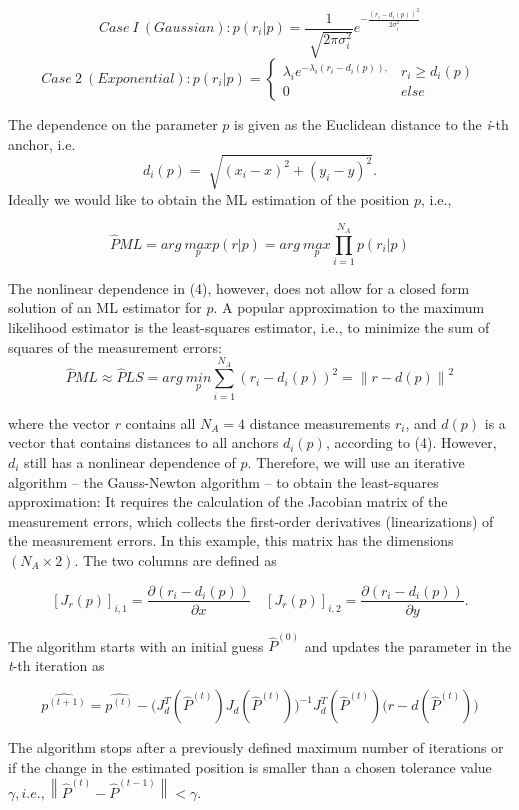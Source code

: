 \documentclass[a4paper]{article}
\newcommand\norm[1]{\left\lVert#1\right\rVert}
\begin{document}
\[
Case ~I ~(Gaussian): p(r_i|p) = \frac{1}{\sqrt[]{2\pi\sigma^2_i}}e^{-\frac{(r_i-d_i(p))^2}{2\sigma^2_i}}
\]
\[
Case ~2 ~(Exponential): p(r_i|p) = \begin{cases} \lambda_i e^{-\lambda_i(r_i-d_i(p)),} & r_i\geq d_i(p)\\ 0 & else  \end{cases}
\]

\noindent
The dependence on the parameter $p$ is given as the Euclidean distance to the \textit{i}-th anchor, i.e.
\[
d_i(p) = \sqrt[]{(x_i-x)^2 + (y_i-y)^2}.
\]
Ideally we would like to obtain the ML estimation of the position $p$, i.e.,

\[
\hat{P}ML = arg ~\underset{p}{max} p(r|p) = arg ~\underset{p}{max} \prod_{i=1}^{N_A} p(r_i|p)
\]

\noindent
The nonlinear dependence in (4), however, does not allow for a closed form solution of an ML estimator for $p$. A popular approximation to the maximum likelihood estimator is the least-squares estimator, i.e., to minimize the sum of squares of the measurement errors:
\[
\hat{P}ML \approx \hat{P}LS = arg ~\underset{p}{min} \sum_{i=1}^{N_A} (r_i-d_i(p))^2 = \norm{r-d(p)}^2 
\]

\noindent
where the vector $r$ contains all $N_A = 4$ distance measurements $r_i$, and $d(p)$ is a vector that contains distances to all anchors $d_i(p)$, according to (4).
However, $d_i$ still has a nonlinear dependence of $p$. Therefore, we will use an iterative algorithm – the Gauss-Newton algorithm – to obtain the least-squares approximation: It requires the calculation of the Jacobian matrix of the measurement errors, which collects the first-order derivatives (linearizations) of the measurement errors. In this example, this matrix has the dimensions $(N_A × 2)$. The two columns are defined as

\[
[J_r(p)]_{i,1} = \frac{\partial(r_i-d_i(p))}{\partial x} \quad [J_r(p)]_{i,2} = \frac{\partial(r_i-d_i(p))}{\partial y}.
\]

\noindent
The algorithm starts with an initial guess $\hat{P}^(0)$ and updates the parameter in the \textit{t}-th iteration as

\[
\hat{p^{(t+1)}} = \hat{p^{(t)}} - \Big ( J^T_d(\hat{P}^{(t)})J_d(\hat{P}^{(t)})\Big) ^{-1} J^T_d(\hat{P}^{(t)}) \Big (r-d(\hat{P}^{(t)}) \Big)
\]

\noindent
The algorithm stops after a previously defined maximum number of iterations or if the change in the estimated position is smaller than a chosen tolerance value $ \gamma, i.e., \norm{\hat{P}^{(t)} - \hat{P}^{(t-1)}} < \gamma$.
\end{document}
